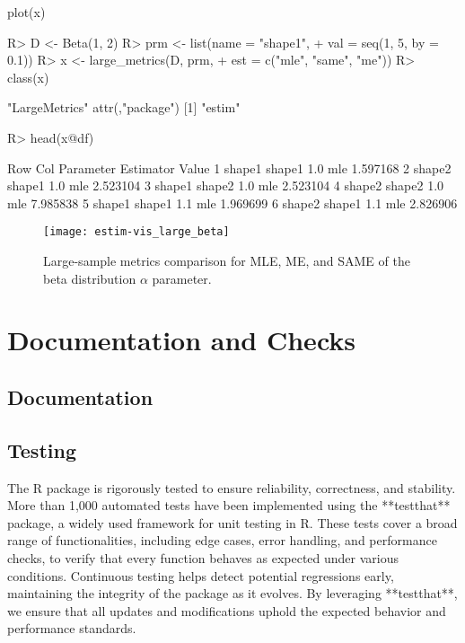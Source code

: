 \documentclass[nojss]{jss}
\begin{document}
\begin{CodeChunk}
\begin{CodeInput}
plot(x)
\end{CodeInput}
\end{CodeChunk}

\begin{Schunk}
\begin{Sinput}
R> D <- Beta(1, 2)
R> prm <- list(name = "shape1",
+              val = seq(1, 5, by = 0.1))
R> x <- large_metrics(D, prm,
+                     est = c("mle", "same", "me"))
R> class(x)
\end{Sinput}
\begin{Soutput}
[1] "LargeMetrics"
attr(,"package")
[1] "estim"
\end{Soutput}
\begin{Sinput}
R> head(x@df)
\end{Sinput}
\begin{Soutput}
     Row    Col Parameter Estimator    Value
1 shape1 shape1       1.0       mle 1.597168
2 shape2 shape1       1.0       mle 2.523104
3 shape1 shape2       1.0       mle 2.523104
4 shape2 shape2       1.0       mle 7.985838
5 shape1 shape1       1.1       mle 1.969699
6 shape2 shape1       1.1       mle 2.826906
\end{Soutput}
\end{Schunk}

\begin{figure}[t!]
\centering
\texttt{[image: estim-vis\_large\_beta]}
  \caption{\label{fig:vis-large-beta} Large-sample metrics comparison for MLE, ME, and SAME of the beta distribution $\alpha$ parameter.}
\end{figure}

\section[Documentation and Checks]{Documentation and Checks} \label{s:doc}

\subsection[Documentation]{Documentation}

\subsection[Testing]{Testing}

The R package is rigorously tested to ensure reliability, correctness, and stability. More than 1,000 automated tests have been implemented using the **testthat** package, a widely used framework for unit testing in R. These tests cover a broad range of functionalities, including edge cases, error handling, and performance checks, to verify that every function behaves as expected under various conditions. Continuous testing helps detect potential regressions early, maintaining the integrity of the package as it evolves. By leveraging **testthat**, we ensure that all updates and modifications uphold the expected behavior and performance standards.
\end{document}
